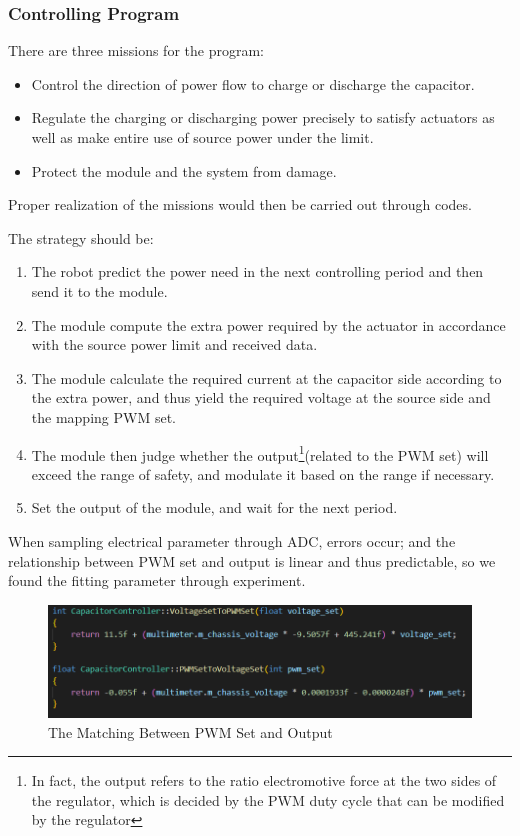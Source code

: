 \documentclass[a4paper,num-refs]{oup-contemporary}
\begin{document}
\subsubsection{Controlling Program}
There are three missions for the program:
\begin{itemize}
	\item Control the direction of power flow to charge or discharge the capacitor.
	\item Regulate the charging or discharging power precisely to satisfy actuators as well as make entire use of source power under the limit.
	\item Protect the module and the system from damage.
\end{itemize}
Proper realization of the missions would then be carried out through codes.

The strategy should be:
\begin{enumerate}
	\item The robot predict the power need in the next controlling period and then send it to the module.
	\item The module compute the extra power required by the actuator in accordance with the source power limit and received data.
	\item The module calculate the required current at the capacitor side according to the extra power, and thus yield the required voltage at the source side and the mapping PWM set.
	\item The module then judge whether the output\footnote{In fact, the output refers to the ratio electromotive force at the two sides of the regulator, which is decided by the PWM duty cycle that can be modified by the regulator}(related to the PWM set) will exceed the range of safety, and modulate it based on the range if necessary.
	\item Set the output of the module, and wait for the next period.
\end{enumerate}

When sampling electrical parameter through ADC, errors occur; and the relationship between PWM set and output is linear and thus predictable, so we found the fitting parameter through experiment.

\begin{figure}[h]
	\centering
	\includegraphics[width=0.8\linewidth]{PWMandVoltage.png}
	\caption{The Matching Between PWM Set and Output}
\end{figure} 
\end{document}
